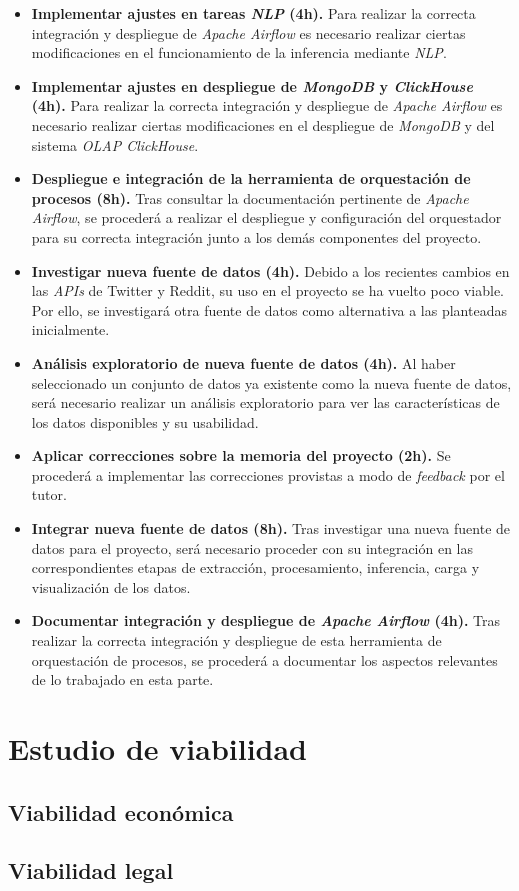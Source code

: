 \begin{itemize}
    \item \textbf{Implementar ajustes en tareas \textit{NLP} (4h).} Para realizar la correcta integración y despliegue de \textit{Apache Airflow} es necesario realizar ciertas modificaciones en el funcionamiento de la inferencia mediante \textit{NLP}.
    
    \item \textbf{Implementar ajustes en despliegue de \textit{MongoDB} y \textit{ClickHouse} (4h).} Para realizar la correcta integración y despliegue de \textit{Apache Airflow} es necesario realizar ciertas modificaciones en el despliegue de \textit{MongoDB} y del sistema \textit{OLAP ClickHouse}.
    
    \item \textbf{Despliegue e integración de la herramienta de orquestación de procesos (8h).} Tras consultar la documentación pertinente de \textit{Apache Airflow}, se procederá a realizar el despliegue y configuración del orquestador para su correcta integración junto a los demás componentes del proyecto.
    
    \item \textbf{Investigar nueva fuente de datos (4h).} Debido a los recientes cambios en las \textit{APIs} de Twitter y Reddit, su uso en el proyecto se ha vuelto poco viable. Por ello, se investigará otra fuente de datos como alternativa a las planteadas inicialmente.

    \item \textbf{Análisis exploratorio de nueva fuente de datos (4h).} Al haber seleccionado un conjunto de datos ya existente como la nueva fuente de datos, será necesario realizar un análisis exploratorio para ver las características de los datos disponibles y su usabilidad.

    \item \textbf{Aplicar correcciones sobre la memoria del proyecto (2h).} Se procederá a implementar las correcciones provistas a modo de \textit{feedback} por el tutor.

    \item \textbf{Integrar nueva fuente de datos (8h).} Tras investigar una nueva fuente de datos para el proyecto, será necesario proceder con su integración en las correspondientes etapas de extracción, procesamiento, inferencia, carga y visualización de los datos.

    \item \textbf{Documentar integración y despliegue de \textit{Apache Airflow} (4h).} Tras realizar la correcta integración y despliegue de esta herramienta de orquestación de procesos, se procederá a documentar los aspectos relevantes de lo trabajado en esta parte.

\end{itemize}


\section{Estudio de viabilidad}

\subsection{Viabilidad económica}

\subsection{Viabilidad legal}


